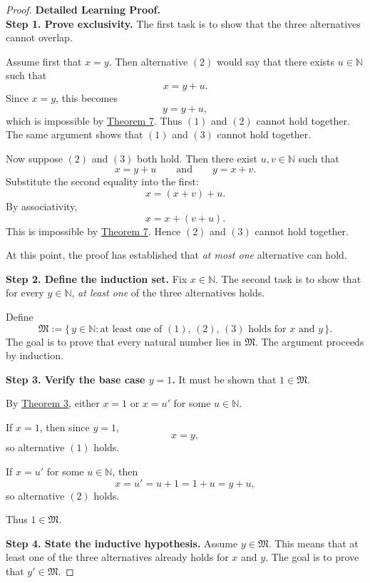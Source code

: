 \begin{proof}
\textbf{Detailed Learning Proof.}~\\

\textbf{Step 1. Prove exclusivity.}
The first task is to show that the three alternatives cannot overlap.

Assume first that \(x=y\). Then alternative \((2)\) would say that there exists \(u\in\mathbb{N}\) such that
\[
x=y+u.
\]
Since \(x=y\), this becomes
\[
y=y+u,
\]
which is impossible by \hyperref[thm:no-natural-number-equals-itself-plus-a-natural-number]{Theorem 7}. Thus \((1)\) and \((2)\) cannot hold together. The same argument shows that \((1)\) and \((3)\) cannot hold together.

Now suppose \((2)\) and \((3)\) both hold. Then there exist \(u,v\in\mathbb{N}\) such that
\[
x=y+u
\qquad\text{and}\qquad
y=x+v.
\]
Substitute the second equality into the first:
\[
x=(x+v)+u.
\]
By associativity,
\[
x=x+(v+u).
\]
This is impossible by \hyperref[thm:no-natural-number-equals-itself-plus-a-natural-number]{Theorem 7}. Hence \((2)\) and \((3)\) cannot hold together.

At this point, the proof has established that \emph{at most one} alternative can hold.

\textbf{Step 2. Define the induction set.}
Fix \(x\in\mathbb{N}\). The second task is to show that for every \(y\in\mathbb{N}\), \emph{at least one} of the three alternatives holds.

Define
\[
\mathfrak{M}:=\{\,y\in\mathbb{N} : \text{at least one of \((1)\), \((2)\), \((3)\) holds for }x\text{ and }y\,\}.
\]
The goal is to prove that every natural number lies in \(\mathfrak{M}\). The argument proceeds by induction.

\textbf{Step 3. Verify the base case \(y=1\).}
It must be shown that \(1\in\mathfrak{M}\).

By \hyperref[thm:every-natural-number-is-one-or-a-successor]{Theorem 3}, either \(x=1\) or \(x=u'\) for some \(u\in\mathbb{N}\).

If \(x=1\), then since \(y=1\),
\[
x=y,
\]
so alternative \((1)\) holds.

If \(x=u'\) for some \(u\in\mathbb{N}\), then
\[
x=u'=u+1=1+u=y+u,
\]
so alternative \((2)\) holds.

Thus \(1\in\mathfrak{M}\).

\textbf{Step 4. State the inductive hypothesis.}
Assume \(y\in\mathfrak{M}\). This means that at least one of the three alternatives already holds for \(x\) and \(y\). The goal is to prove that \(y'\in\mathfrak{M}\).


\end{proof}
